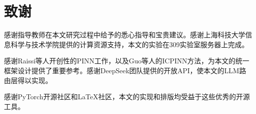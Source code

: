 \chapter[致谢]{致\quad 谢}
\pagestyle{mainmatterstyle}

感谢指导教师在本文研究过程中给予的悉心指导和宝贵建议。感谢上海科技大学信息科学与技术学院提供的计算资源支持，本文的实验在309实验室服务器上完成。

感谢Raissi等人开创性的PINN工作，以及Guo等人的ICPINN方法，为本文的统一框架设计提供了重要参考。感谢DeepSeek团队提供的开放API，使本文的LLM路由层得以实现。

感谢PyTorch开源社区和LaTeX社区，本文的实现和排版均受益于这些优秀的开源工具。

\cleardoublepage[plain]
